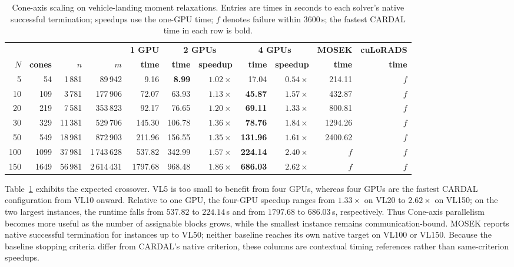 \documentclass[11pt]{article}
\theoremstyle{definition}
\theoremstyle{remark}
\newcommand{\name}{\textsc{CARDAL}\xspace}
\begin{document}
\begin{table}[htbp]
\centering
\caption{Cone-axis scaling on vehicle-landing moment relaxations.  Entries are
times in seconds to each solver's native successful termination; speedups use
the one-GPU time; $f$ denotes failure within $3600$\,s; the fastest \name{}
time in each row is bold.}
\label{tab:conewise}
{\setlength{\tabcolsep}{3.4pt}
\begin{tabular}{rrrrrrrrrrr}
\toprule
& & &
& \textbf{1 GPU} & \multicolumn{2}{c}{\textbf{2 GPUs}}
& \multicolumn{2}{c}{\textbf{4 GPUs}}
& \textbf{MOSEK} & \textbf{cuLoRADS}\\
\cmidrule(lr){5-5}\cmidrule(lr){6-7}\cmidrule(lr){8-9}
\cmidrule(lr){10-10}\cmidrule(lr){11-11}
\textbf{$N$} & \textbf{cones} & \textbf{$n$} & \textbf{$m$}
& \textbf{time} & \textbf{time} & \textbf{speedup}
& \textbf{time} & \textbf{speedup} & \textbf{time} & \textbf{time}\\
\midrule
5   & 54   & 1\,881  & 89\,942     & 9.16    & \textbf{8.99}  & $1.02\times$ & 17.04           & $0.54\times$ & 214.11  & $f$\\
10  & 109  & 3\,781  & 177\,906    & 72.07   & 63.93          & $1.13\times$ & \textbf{45.87}  & $1.57\times$ & 432.87  & $f$\\
20  & 219  & 7\,581  & 353\,823    & 92.17   & 76.65          & $1.20\times$ & \textbf{69.11}  & $1.33\times$ & 800.81  & $f$\\
30  & 329  & 11\,381 & 529\,706    & 145.30  & 106.78         & $1.36\times$ & \textbf{78.76}  & $1.84\times$ & 1294.26 & $f$\\
50  & 549  & 18\,981 & 872\,903    & 211.96  & 156.55         & $1.35\times$ & \textbf{131.96} & $1.61\times$ & 2400.62 & $f$\\
100 & 1099 & 37\,981 & 1\,743\,628 & 537.82  & 342.99         & $1.57\times$ & \textbf{224.14} & $2.40\times$ & $f$     & $f$\\
150 & 1649 & 56\,981 & 2\,614\,431 & 1797.68 & 968.48         & $1.86\times$ & \textbf{686.03} & $2.62\times$ & $f$     & $f$\\
\bottomrule
\end{tabular}
}
\end{table}

Table~\ref{tab:conewise} exhibits the expected crossover.  VL5 is too small
to benefit from four GPUs, whereas four GPUs are the fastest \name{}
configuration from VL10 onward.  Relative to one GPU, the four-GPU speedup
ranges from $1.33\times$ on VL20 to $2.62\times$ on VL150; on the two largest
instances, the runtime falls from $537.82$ to $224.14$\,s and from $1797.68$
to $686.03$\,s, respectively.  Thus Cone-axis parallelism becomes more useful
as the number of assignable blocks grows, while the smallest instance remains
communication-bound.  MOSEK reports native successful termination for
instances up to VL50; neither baseline reaches its own native target on VL100
or VL150.  Because the baseline stopping criteria differ from \name{}'s
native criterion, these columns are contextual timing references rather than
same-criterion speedups.
\end{document}
